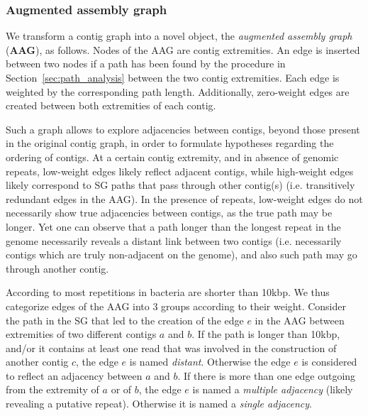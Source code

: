 \documentclass[./main.tex]{subfiles}
\newcommand{\modafterreview}[1]{#1}
\begin{document}
\subsubsection{Augmented assembly graph \label{sec:aag}}

We transform a contig graph into a novel object, the \emph{augmented assembly graph} (\textbf{AAG}), as follows. Nodes of the AAG are contig extremities. An edge is inserted between two nodes if a path has been found by the procedure in Section~\ref{sec:path_analysis} between the two contig extremities. Each edge is weighted by the corresponding path length. Additionally, zero-weight edges are created between both extremities of each contig. 

Such a graph allows to explore adjacencies between contigs, \modafterreview{beyond those present in the original contig graph, in order to formulate hypotheses regarding the ordering of contigs}. \modafterreview{At a certain contig extremity, and in absence of genomic repeats, low-weight edges likely reflect adjacent contigs, while high-weight edges likely correspond to SG paths that pass through other contig(s) (i.e. transitively redundant edges in the AAG). In the presence of repeats, low-weight edges do not necessarily show true adjacencies between contigs, as the true path may be longer. %
Yet one can observe that a path longer than the longest repeat in the genome necessarily reveals a distant link between two contigs (i.e. necessarily contigs which are truly non-adjacent on the genome), and also such path may go through another contig.}

\modafterreview{According to \cite{Treangen2009} most repetitions in bacteria are shorter than 10kbp.} 
We thus categorize edges \modafterreview{of the AAG} into 3 groups \modafterreview{according to their weight}.
Consider the path in the SG that led to the creation of the edge $e$ in the AAG between extremities of two different contigs $a$ and $b$.
If the path is longer than \modafterreview{10kbp}, and/or it contains at least one read that was involved in the construction of another contig $c$, the edge $e$ is named \emph{distant}. Otherwise the edge $e$ is considered to reflect an adjacency between $a$ and $b$. If there is more than one edge outgoing from the extremity of $a$ or of $b$, the edge $e$ is named a \emph{multiple adjacency} \modafterreview{(likely revealing a putative repeat)}. Otherwise it is named a \emph{single adjacency}.
\end{document}
